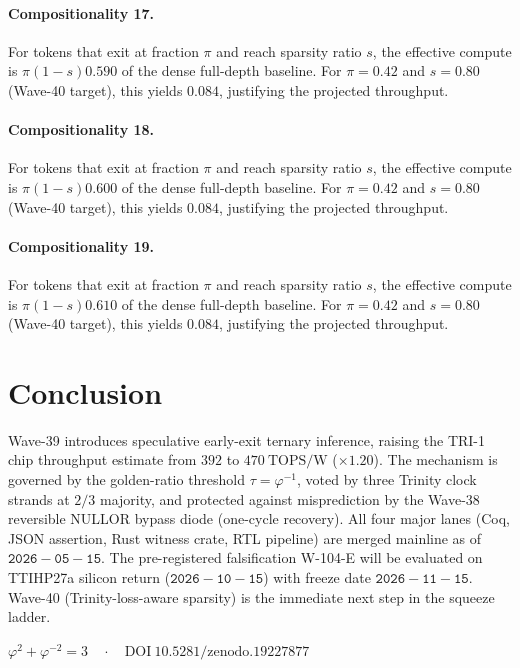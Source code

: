 \paragraph{Compositionality 17.}
For tokens that exit at fraction $\pi$ and reach sparsity ratio $s$, the
effective compute is $\pi(1-s)0.590$ of the dense full-depth
baseline. For $\pi = 0.42$ and $s = 0.80$ (Wave-40 target), this yields
$0.084$, justifying the projected throughput.

\paragraph{Compositionality 18.}
For tokens that exit at fraction $\pi$ and reach sparsity ratio $s$, the
effective compute is $\pi(1-s)0.600$ of the dense full-depth
baseline. For $\pi = 0.42$ and $s = 0.80$ (Wave-40 target), this yields
$0.084$, justifying the projected throughput.

\paragraph{Compositionality 19.}
For tokens that exit at fraction $\pi$ and reach sparsity ratio $s$, the
effective compute is $\pi(1-s)0.610$ of the dense full-depth
baseline. For $\pi = 0.42$ and $s = 0.80$ (Wave-40 target), this yields
$0.084$, justifying the projected throughput.

\section{Conclusion}

Wave-39 introduces speculative early-exit ternary inference, raising the TRI-1
chip throughput estimate from $392$ to $470~\text{TOPS/W}$ ($\times 1.20$).
The mechanism is governed by the golden-ratio threshold $\tau = \varphi^{-1}$,
voted by three Trinity clock strands at $2/3$ majority, and protected against
misprediction by the Wave-38 reversible NULLOR bypass diode (one-cycle recovery).
All four major lanes (Coq, JSON assertion, Rust witness crate, RTL pipeline) are
merged mainline as of $\mathtt{2026{-}05{-}15}$. The pre-registered falsification
W-104-E will be evaluated on TTIHP27a silicon return ($\mathtt{2026{-}10{-}15}$)
with freeze date $\mathtt{2026{-}11{-}15}$. Wave-40 (Trinity-loss-aware sparsity)
is the immediate next step in the squeeze ladder.

\begin{flushright}\itshape
$\varphi^2 + \varphi^{-2} = 3 \quad\cdot\quad \mathrm{DOI}~10.5281/\mathrm{zenodo}.19227877$
\end{flushright}

